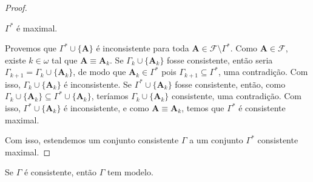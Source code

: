 \begin{proof}
\begin{midproof}
        \end{midproof}
        \begin{claim}
            $\Gamma^*$ é maximal.
        \end{claim}
        \begin{midproof}
            Provemos que $\Gamma^* \cup \{\mathbf{A}\}$ é inconsistente para toda $\mathbf{A} \in \mathcal{F} \setminus \Gamma^*$. Como $\mathbf{A} \in \mathcal{F}$, existe $k \in \omega$ tal que $\mathbf{A} \equiv \mathbf{A}_k$. Se $\Gamma_k \cup \{\mathbf{A}_k \}$ fosse consistente, então seria $\Gamma_{k+1} = \Gamma_k \cup \{\mathbf{A}_k \}$, de modo que $\mathbf{A}_k \in \Gamma^*$ pois $\Gamma_{k+1} \subseteq \Gamma^*$, uma contradição. Com isso, $\Gamma_k \cup \{\mathbf{A}_k \}$ é inconsistente. Se $\Gamma^* \cup \{\mathbf{A}_k\}$ fosse consistente, então, como $\Gamma_{k} \cup \{\mathbf{A}_k \} \subseteq \Gamma^* \cup \{\mathbf{A}_k\}$, teríamos $\Gamma_{k} \cup \{\mathbf{A}_k \}$ consistente, uma contradição. Com isso, $\Gamma^* \cup \{\mathbf{A}_k\}$ é inconsistente, e como $\mathbf{A} \equiv \mathbf{A}_k$, temos que $\Gamma^*$ é consistente maximal. \whiteproof
        \end{midproof}
    Com isso, estendemos um conjunto consistente $\Gamma$ a um conjunto $\Gamma^*$ consistente maximal. \blackproof
\end{proof}

\begin{theorem} \label{teo.fund:consistentetemmodelo}
    Se $\Gamma$ é consistente, então $\Gamma$ tem modelo.
\end{theorem}

